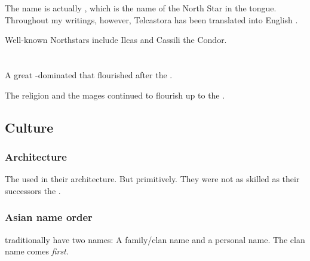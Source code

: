 The name  is actually , which is the name of the North Star in the \Ortaican{} tongue. 
Throughout my writings, however, Telcastora has been translated into English . 

Well-known Northstars include Ilcas and Cassili the Condor. 
























\chapter{\Ortaica}
\index{\Ortaica}
A great -dominated  that flourished after the . 

The \Ortaican religion and the  mages continued to flourish up to the \thirdbanewar. 









\section{Culture}





\subsection{Architecture}
The \Ortaicans{} used  in their architecture. 
But primitively.
They were not as skilled as their successors the . 





\subsection{Asian name order}
\Ortaican{} traditionally have two names: 
A family/clan name and a personal name. 
The clan name comes \emph{first}. 

